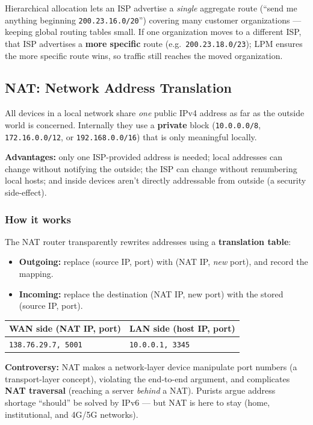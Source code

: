 \documentclass[hidelinks]{article}
\begin{document}
Hierarchical allocation lets an ISP advertise a \emph{single} aggregate route
(``send me anything beginning \texttt{200.23.16.0/20}'') covering many
customer organizations --- keeping global routing tables small. If one
organization moves to a different ISP, that ISP advertises a \textbf{more
specific} route (e.g.\ \texttt{200.23.18.0/23}); LPM ensures the more specific
route wins, so traffic still reaches the moved organization.

\subsection{NAT: Network Address Translation}

All devices in a local network share \emph{one} public IPv4 address as far as
the outside world is concerned. Internally they use a \textbf{private} block
(\texttt{10.0.0.0/8}, \texttt{172.16.0.0/12}, or \texttt{192.168.0.0/16}) that
is only meaningful locally.

\textbf{Advantages:} only one ISP-provided address is needed; local addresses
can change without notifying the outside; the ISP can change without
renumbering local hosts; and inside devices aren't directly addressable from
outside (a security side-effect).

\subsubsection{How it works}
The NAT router transparently rewrites addresses using a \textbf{translation
table}:
\begin{itemize}
    \item \textbf{Outgoing:} replace (source IP, port) with
    (NAT IP, \emph{new} port), and record the mapping.
    \item \textbf{Incoming:} replace the destination (NAT IP, new port) with
    the stored (source IP, port).
\end{itemize}

\renewcommand{\arraystretch}{1.3}
\noindent\begin{tabularx}{\textwidth}{|X|X|}
\hline
\textbf{WAN side (NAT IP, port)} & \textbf{LAN side (host IP, port)} \\
\hline
\texttt{138.76.29.7, 5001} & \texttt{10.0.0.1, 3345} \\
\hline
\end{tabularx}

\medskip
\noindent \textbf{Controversy:} NAT makes a network-layer device manipulate
port numbers (a transport-layer concept), violating the end-to-end argument,
and complicates \textbf{NAT traversal} (reaching a server \emph{behind} a
NAT). Purists argue address shortage ``should'' be solved by IPv6 --- but NAT
is here to stay (home, institutional, and 4G/5G networks).
\end{document}

